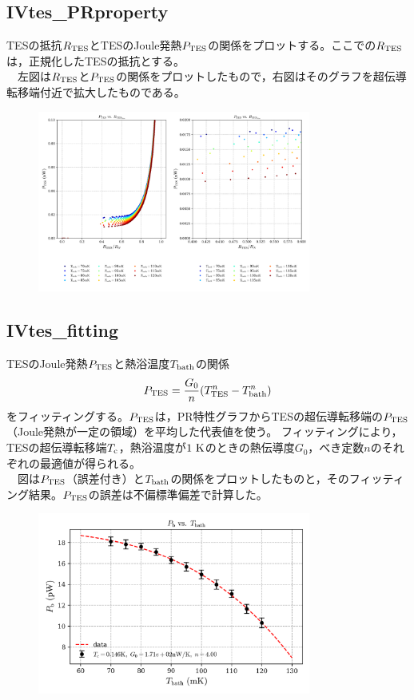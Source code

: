 \documentclass[platex,dvipdfmx,10pt,twoside,a4paper,jis2004]{jsarticle}
\begin{document}
\subsection*{IVtes\_PRproperty}
TESの抵抗$R_{\rm TES }$とTESのJoule発熱$P_{\rm TES}$の関係をプロットする。ここでの$R_{\rm TES}$は，正規化したTESの抵抗とする。
\\　左図は$R_{\rm TES }$と$P_{\rm TES}$の関係をプロットしたもので，右図はそのグラフを超伝導転移端付近で拡大したものである。
\begin{figure}[H]
    \centering
    \includegraphics[width=0.8\textwidth]{IVtes_PRproperty.png}
    \label{fig:IVtesPRproperty}
\end{figure}
\clearpage

\subsection*{IVtes\_fitting}
TESのJoule発熱$P_{\rm TES}$と熱浴温度$T_{\rm bath}$の関係
\[
P_{\rm TES} = \frac{G_0}{n}(T_{\rm TES}^n - T_{\rm bath}^n)
\]
をフィッティングする。$P_{\rm TES}$は，PR特性グラフからTESの超伝導転移端の$P_{\rm TES}$（Joule発熱が一定の領域）を平均した代表値を使う。
フィッティングにより，TESの超伝導転移端$T_{\rm c}$，熱浴温度が$1\ {\rm K}$のときの熱伝導度$G_0$，べき定数$n$のそれぞれの最適値が得られる。
\\　図は$P_{\rm TES}$（誤差付き）と$T_{\rm bath}$の関係をプロットしたものと，そのフィッティング結果。$P_{\rm TES}$の誤差は不偏標準偏差で計算した。

\begin{figure}[H]
    \centering
    \includegraphics[width=0.8\textwidth]{IVtes_fitting.png}
    \label{fig:IVtesfitting}
\end{figure}
\clearpage
\end{document}
